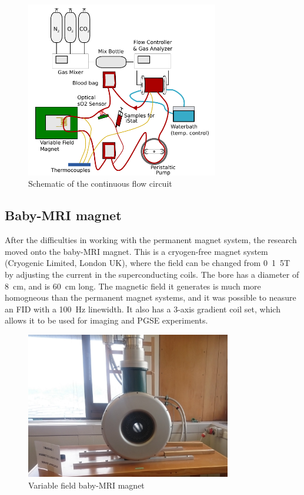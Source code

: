 \begin{figure}[t]
\centering
\includegraphics[width=0.75\textwidth]{figures/exptsetup/contflowschematic.pdf}
\caption{Schematic of the continuous flow circuit}
\label{fig:exptsetup-contflow-schematic}
\end{figure}

\subsection{Baby-MRI magnet}
After the difficulties in working with the permanent magnet system, the research moved onto the baby-MRI magnet.
This is a cryogen-free magnet system (Cryogenic Limited, London UK), where the field can be changed from \SI{0}{1.5}{T} by adjusting the current in the superconducting coils.
The bore has a diameter of \SI{8}{cm}, and is \SI{60}{cm} long.
The magnetic field it generates is much more homogneous than the permanent magnet systems, and it was possible to neasure an FID with a \SI{100}{Hz} linewidth.
It also has a 3-axis gradient coil set, which allows it to be used for imaging and PGSE experiments.

\begin{figure}[t]
\centering
\includegraphics[width=0.8\textwidth]{figures/exptsetup/babymri.jpg}
\caption{Variable field baby-MRI magnet}
\label{fig:exptsetup-babymri}
\end{figure}

